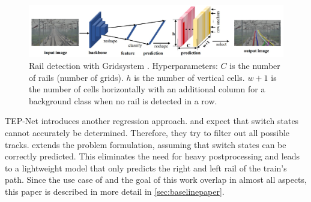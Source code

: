 \begin{figure}[H]
    \centering
    \includegraphics[width=\linewidth]{PICs/lineDetection/gridDetection.jpg}
    \caption{Rail detection with Gridsystem \cite{li2022rail}. Hyperparameters: $C$ is the number of rails (number of grids). $h$ is the number of vertical cells. $w+1$ is the number of cells horizontally with an additional column for a background class when no rail is detected in a row.}
    \label{fig:gridLineDetection}
\end{figure}

\noindent \ac{TEP}-Net \cite{tepNet2024} introduces another regression approach.
\cite{RailraodSemanticPossibleTracks2020} and \cite{TPENet2023} expect that switch states cannot accurately be determined.
Therefore, they try to filter out all possible tracks.
\cite{tepNet2024} extends the problem formulation, assuming that switch states can be correctly predicted.
This eliminates the need for heavy postprocessing and leads to a lightweight model that only predicts the right and left rail of the train's path.
Since the use case of \cite{tepNet2024} and the goal of this work overlap in almost all aspects, this paper is described in more detail in \autoref{sec:baselinepaper}.